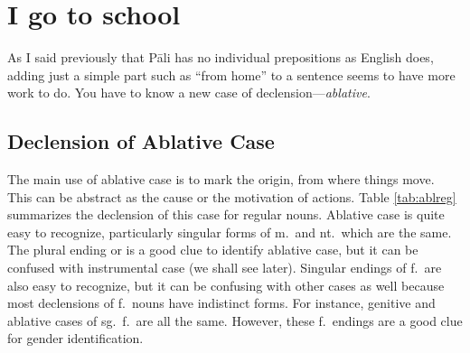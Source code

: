 \chapter{I go to school }\label{chap:abl}

As I said previously that P\=ali has no individual prepositions as English does, adding just a simple part such as ``from home'' to a sentence seems to have more work to do. You have to know a new case of declension---\emph{ablative}.

{}
\section*{Declension of Ablative Case}

The main use of ablative case is to mark the origin, from where things move. This can be abstract as the cause or the motivation of actions. Table \ref{tab:ablreg} summarizes the declension of this case for regular nouns. Ablative case is quite easy to recognize, particularly singular forms of m.\ and nt.\ which are the same. The plural ending  or  is a good clue to identify ablative case, but it can be confused with instrumental case (we shall see later). Singular endings of f.\ are also easy to recognize, but it can be confusing with other cases as well because most declensions of f.\ nouns have indistinct forms. For instance, genitive and ablative cases of sg.\ f.\ are all the same. However, these f.\ endings are a good clue for gender identification.

